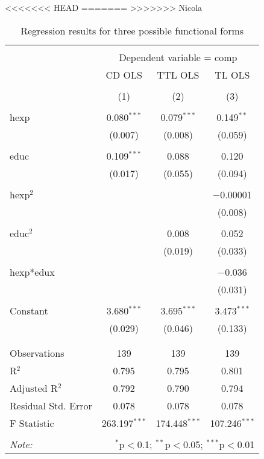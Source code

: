 \documentclass[12pt,a4paper]{article}\usepackage[]{graphicx}\usepackage[]{color}
\begin{document}
<<<<<<< HEAD
=======
>>>>>>> Nicola
\begin{table}[!htbp] \centering 
  \caption{Regression results for three possible functional forms} 
  \label{} 
\small 
\begin{tabular}{@{\extracolsep{5pt}}lccc} 
\\[-1.8ex]\hline 
\hline \\[-1.8ex] 
 & \multicolumn{3}{c}{Dependent variable = comp} \\ 
\cline{2-4} 
 & CD OLS & TTL OLS & TL OLS \\ 
\\[-1.8ex] & (1) & (2) & (3)\\ 
\hline \\[-1.8ex] 
 hexp & 0.080$^{***}$ & 0.079$^{***}$ & 0.149$^{**}$ \\ 
  & (0.007) & (0.008) & (0.059) \\ 
  & & & \\ 
 educ & 0.109$^{***}$ & 0.088 & 0.120 \\ 
  & (0.017) & (0.055) & (0.094) \\ 
  & & & \\ 
 hexp$^2$ &  &  & $-$0.00001 \\ 
  &  &  & (0.008) \\ 
  & & & \\ 
 educ$^2$ &  & 0.008 & 0.052 \\ 
  &  & (0.019) & (0.033) \\ 
  & & & \\ 
 hexp*edux &  &  & $-$0.036 \\ 
  &  &  & (0.031) \\ 
  & & & \\ 
 Constant & 3.680$^{***}$ & 3.695$^{***}$ & 3.473$^{***}$ \\ 
  & (0.029) & (0.046) & (0.133) \\ 
  & & & \\ 
\hline \\[-1.8ex] 
Observations & 139 & 139 & 139 \\ 
R$^{2}$ & 0.795 & 0.795 & 0.801 \\ 
Adjusted R$^{2}$ & 0.792 & 0.790 & 0.794 \\ 
Residual Std. Error & 0.078 & 0.078 & 0.078 \\ 
F Statistic & 263.197$^{***}$ & 174.448$^{***}$ & 107.246$^{***}$ \\ 
\hline 
\hline \\[-1.8ex] 
\textit{Note:}  & \multicolumn{3}{r}{$^{*}$p$<$0.1; $^{**}$p$<$0.05; $^{***}$p$<$0.01} \\ 
\end{tabular} 
\end{table} 
\end{document}
